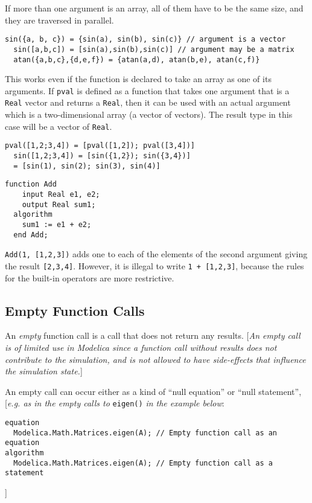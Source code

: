 If more than one argument is an array, all of them have to be the same
size, and they are traversed in parallel.

\begin{example}
\begin{lstlisting}[language=modelica]
  sin({a, b, c}) = {sin(a), sin(b), sin(c)} // argument is a vector
  sin([a,b,c]) = [sin(a),sin(b),sin(c)] // argument may be a matrix
  atan({a,b,c},{d,e,f}) = {atan(a,d), atan(b,e), atan(c,f)}
\end{lstlisting}
This works even if the function is declared to take an array as
one of its arguments. If \lstinline!pval! is defined as a function that takes
one argument that is a \lstinline!Real! vector and returns a \lstinline!Real!, then it can
be used with an actual argument which is a two-dimensional array (a
vector of vectors). The result type in this case will be a vector of
\lstinline!Real!.
\begin{lstlisting}[language=modelica]
  pval([1,2;3,4]) = [pval([1,2]); pval([3,4])]
  sin([1,2;3,4]) = [sin({1,2}); sin({3,4})]
  = [sin(1), sin(2); sin(3), sin(4)]
\end{lstlisting}
\begin{lstlisting}[language=modelica]
  function Add
    input Real e1, e2;
    output Real sum1;
  algorithm
    sum1 := e1 + e2;
  end Add;
\end{lstlisting}
\lstinline!Add(1, [1,2,3])! adds one to each of the elements of the second
argument giving the result \lstinline![2,3,4]!. However, it is illegal to
write \lstinline!1 + [1,2,3]!, because the rules for the built-in
operators are more restrictive.
\end{example}

\subsection{Empty Function Calls}

An \emph{empty} function call is a call that does not return any results.
{[}\emph{An empty call is of limited use in Modelica since a function
call without results does not contribute to the simulation, and is not
allowed to have side-effects that influence the simulation state.}{]}

An empty call can occur either as a kind of ``null equation'' or
``null statement'', {[}\emph{e.g. as in the empty calls to} \lstinline!eigen()!
\emph{in the example below}:

\begin{lstlisting}[language=modelica]
equation
  Modelica.Math.Matrices.eigen(A); // Empty function call as an equation
algorithm
  Modelica.Math.Matrices.eigen(A); // Empty function call as a statement
\end{lstlisting}
{]}

